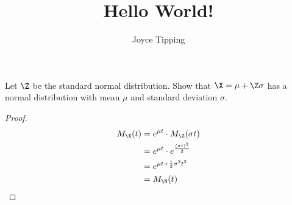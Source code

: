 \documentclass{article}
\begin{document}
\title{Hello World!}
\author{Joyce Tipping}
\date{}
\maketitle

Let $\Z$ be the standard normal distribution. Show that $\X = \mu + \Z\sigma$ has a normal
distribution with mean $\mu$ and standard deviation $\sigma$.

\begin{proof}
\begin{align*}
M_{\X}(t) & = e^{\mu t} \cdot M_{\Z}(\sigma t) \\
& = e^{\mu t} \cdot e^{\frac{(\sigma t)^2}{2}} \\
& = e^{\mu t + \frac{1}{2}\sigma^2t^2} \\
& = M_{\N}(t)
\end{align*}
\end{proof}
\end{document}

